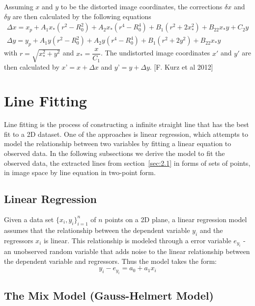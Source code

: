 Assuming $x$ and $y$ to be the distorted image coordinates, the corrections $\delta x$ and $\delta y$ are then calculated by the following equations
\begin{equation} %
\begin{aligned}
\Delta x = x_p + A_1x_*(r^2-R_0^2) + A_2x_*(r^4-R_0^4) + B_1(r^2+2x_*^2) + B_22x_*y+C_2y \\
\Delta y = y_p + A_1y  (r^2-R_0^2) + A_2y  (r^4-R_0^4) + B_1(r^2+2y^2)   + B_22x_*y
\end{aligned}
\end{equation}
with $r=\sqrt{x_*^2+y^2}$ and $x_*=\dfrac{x}{C_1}$. The undistorted image coordinates $x\prime$ and $y\prime$ are then calculated by $x’=x+\Delta x$ and $y’=y+\Delta y$. [F. Kurz et al 2012] 



\section{Line Fitting}
\label{sec:2.3.LineFitting}

Line fitting is the process of constructing a infinite straight line that has the best fit to a 2D dataset. One of the approaches is linear regression, which attempts to model the relationship between two variables by fitting a linear equation to observed data. In the following subsections we derive the model to fit the observed data, the extracted lines from section~\ref{sec:2.1} in forms of sets of points, in image space by line equation in two-point form.

\subsection{Linear Regression}
\label{subsec:2.3.1}
Given a data set $\{x_i,y_i\}^n_{i=1}$ of $n$ points on a 2D plane, a linear regression model assumes that the relationship between the dependent variable $y_i$ and the regressors $x_i$ is linear. This relationship is modeled through a error variable $e_{y_i}$ -an unobserved random variable that adds noise to the linear relationship between the dependent variable and regressors.
Thus the model takes the form:
\begin{equation} %
y_i - e_{y_i} = a_0 + a_1x_i
\end{equation}

\subsection{The Mix Model (Gauss-Helmert Model)}
\label{subsec:2.3.2}

